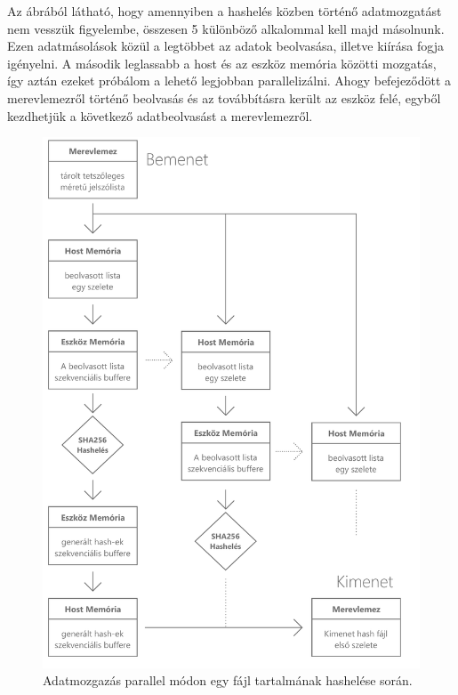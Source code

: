 Az ábrából látható, hogy amennyiben a hashelés közben történő adatmozgatást nem vesszük figyelembe, összesen 5 különböző alkalommal kell majd másolnunk. Ezen adatmásolások közül a legtöbbet az adatok beolvasása, illetve kiírása fogja igényelni. A második leglassabb a host és az eszköz memória közötti mozgatás, így aztán ezeket próbálom a lehető legjobban parallelizálni. Ahogy befejeződött a merevlemezről történő beolvasás és az továbbításra került az eszköz felé, egyből kezdhetjük a következő adatbeolvasást a merevlemezről.


\begin{figure}[H]
    \centering 
    \includegraphics[width=\textwidth]{images/pdf/data-movement-parallel.pdf}
    \caption{Adatmozgazás parallel módon egy fájl tartalmának hashelése során.}
    \label{fig:parallelgpu}
\end{figure}

